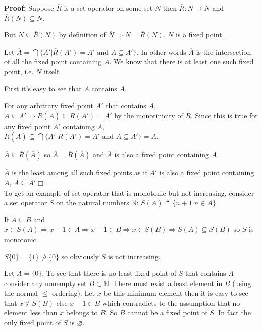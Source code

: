 \documentclass[10pt]{article}
\newcommand{\defined}{\triangleq}
\begin{document}
\textbf{Proof:} Suppose $\overline R$ is a set operator on some set $N$ then $\overline R : N \rightarrow N$ and $\overline R (N) \subseteq N$.

But $N \subseteq \overline R (N)$ by definition of $\overline{N} \Rightarrow N = \overline{R} (N)$. $N$ is a fixed point.

Let $\overline{A} = \bigcap \{A' | \overline{R} (A') = A' \text{ and } A \subseteq A'\}$. In other words $\overline{A}$ is the intersection of all the fixed point containing $A$. We know that there is at least one such fixed point, i.e. $N$ itself.

First it's easy to see that $\overline{A}$ contains $A$.

For any arbitrary fixed point $A'$ that contains $A$, $\overline{A} \subseteq A'\Rightarrow \overline{R} (\overline{A}) \subseteq \overline R (A') = A'$ by the monotinicity of $\overline R$. Since this is true for any fixed point $A'$ containing $A$,  $\overline{R} (\overline{A}) \subseteq \bigcap \{A' | \overline{R} (A') = A' \text{ and } A \subseteq A'\} = \overline{A}$.

$\overline{A} \subseteq \overline{R} (\overline{A})$ so $\overline{A} = \overline{R} (\overline{A})$ and $\overline{A}$ is also a fixed point containing $A$.

$\overline{A}$ is the least among all such fixed points as if $A'$ is also a fixed point containing $A$, $\overline{A} \subseteq A' \Box$.\\

To get an example of set operator that is monotonic but not increasing, consider a set operator $S$ on the natural numbers $\mathbb{N}$: $S (A)\defined \{n+1 | n \in A\}$.

If $A \subseteq B$ and $x \in S(A) \Rightarrow x-1 \in A \Rightarrow x-1 \in B \Rightarrow x \in S(B) \Rightarrow S(A) \subseteq S(B)$ so $S$ is monotonic.

$S\{0\} = \{1\} \nsupseteq \{0\}$ so obviously $S$ is not increasing.

Let $A = \{0\}$. To see that there is no least fixed point of $S$ that contains $A$ consider any nonempty set $B \subset \mathbb{N}$. There must exist a least element in $B$ (using the normal $\leq$ ordering). Let $x$ be this minimum element then it is easy to see that $x \notin S(B)$ else $x-1 \in B$ which contradicts to the assumption that no element less than $x$ belongs to $B$. So $B$ cannot be a fixed point of $S$. In fact the only fixed point of $S$ is $\varnothing$.
\end{document}
